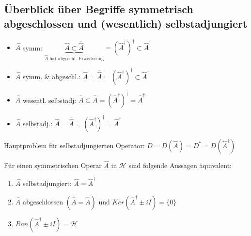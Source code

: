 \subsection{Überblick über Begriffe symmetrisch abgeschlossen und (wesentlich) selbstadjungiert}
\begin{itemize}
    \item $\hat{A}$ symm: $\underbrace{\hat{A} \subset \overline{\hat{A}}}_{\hat{A} \textrm{ hat 
            abgeschl. Erweiterung}} = \left(\hat{A}^\dagger\right)^\dagger \subset \hat{A}^\dagger$
    \item $\hat{A}$ symm. \& abgeschl.: $\hat{A} = \overline{\hat{A}} = \left(\hat{A}^\dagger\right)^\dagger
            \subset \hat{A}^\dagger$
    \item $\hat{A}$ wesentl. selbstadj: $\hat{A} \subset \overline{\hat{A}} =
            \left(\hat{A}^\dagger\right)^\dagger = \hat{A}^\dagger$
    \item $\hat{A}$ selbstadj.: $\hat{A} = \overline{\hat{A}} = \left(\hat{A}^\dagger\right)^\dagger =
            \hat{A}^\dagger$
\end{itemize}

Hauptproblem für selbstadjungierten Operator: $D = D(\hat{A}) = D^\ast = D(\hat{A}^\dagger)$

\begin{Satz}
    Für einen symmetrischen Operar $\hat{A}$ in $\mathcal{H}$ sind folgende Aussagen äquivalent:
    \begin{enumerate}[label=(\alph*)]
        \item $\hat{A}$ selbstadjungiert: $\hat{A} = \hat{A}^\dagger$
        \item $\hat{A}$ abgeschlossen $\left( \overline{\hat{A}} = \hat{A} \right)$ und
                $Ker(\hat{A}^\dagger \pm iI) = \{0\}$
        \item $Ran(\hat{A}^\dagger \pm iI) = \mathcal{H}$
    \end{enumerate}
\end{Satz}

